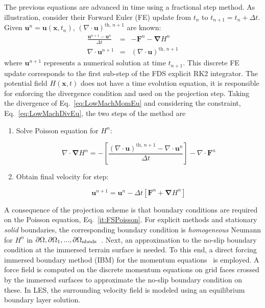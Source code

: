 \documentclass[journal,article,atmosphere,submit,moreauthors,pdftex]{Definitions/mdpi}
\begin{document}
The previous equations are advanced in time using a fractional step method. As illustration, consider their Forward Euler (FE) update from $t_n$ to $t_{n+1}=t_n + \Delta t$. Given $ \mathbf{u}^n=\mathbf{u}(\mathbf{x},t_n)$, $\left( \nabla \cdot \mathbf{u} \right)^{\mathrm{th},\,n+1}$ are known:
\begin{eqnarray}
  \frac{\mathbf{u}^{n+1}-\mathbf{u}^{n}}{\Delta t} &=& - \mathbf{F}^n -  \boldsymbol{\nabla} H^n \label{eq:LowMachMomEu}\\
  \nabla \cdot \mathbf{u}^{n+1} &=& \left( \nabla \cdot \mathbf{u} \right)^{\mathrm{th},\,n+1} \label{eq:LowMachDivEu}
\end{eqnarray}
where $\mathbf{u}^{n+1}$ represents a numerical solution at time $t_{n+1}$. This discrete FE update corresponds to the first sub-step of the FDS explicit RK2 integrator. The potential field $H(\mathbf{x},t)$ does not have a time evolution equation, it is responsible for enforcing the divergence condition and used on the projection step. Taking the divergence of Eq.~\eqref{eq:LowMachMomEu} and considering  the constraint, Eq.~\eqref{eq:LowMachDivEu}, the two steps of the method are
\begin{enumerate}
  \item Solve Poisson equation for $H^n$:

\begin{equation}
   \nabla \cdot \boldsymbol{\nabla} H^n = - \left[ \frac{\left( \nabla \cdot \mathbf{u} \right)^{\mathrm{th},\,n+1} - \nabla \cdot \mathbf{u}^{n}}{\Delta t} \right] - \nabla \cdot \mathbf{F}^n \label{it:FSPoisson}
\end{equation}

  \item Obtain final velocity for step:

  \begin{equation}
     \mathbf{u}^{n+1} = \mathbf{u}^{n} - \Delta t \left[ \mathbf{F}^n +  \boldsymbol{\nabla} H^n \right] \label{it:FSProject}
   \end{equation}

\end{enumerate}
A consequence of the projection scheme is that boundary conditions are required on the Poisson equation, Eq.~\eqref{it:FSPoisson}. For explicit methods and stationary \textit{solid} boundaries, the corresponding boundary condition is \textit{homogeneous} Neumann for $H^n$ in $\partial \Omega,\partial \Omega_1,...,\partial \Omega_{\rm nbods}$~\cite{perot_1993}.
Next, an approximation to the no-slip boundary condition at the immersed terrain surface is needed. To this end, a direct forcing immersed boundary method (IBM) for the momentum equations~\cite{fadlun_2000} is employed. A force field is computed on the discrete momentum equations on grid faces crossed by the immersed surfaces to approximate the no-slip boundary condition on these. In LES, the surrounding velocity field is modeled using an equilibrium boundary layer solution.
\end{document}
